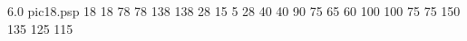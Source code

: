  6.0 pic18.psp 
{}{}{
 18 
 18 
 78 
 78 
 138 
 138 
 28  
 15 
 5 
 28 
 40 
 40 
 90 
 75 
 65 
 60 
 100 
 100 
 75 
 75 
 150 
 135 
 125 
 115 
}
